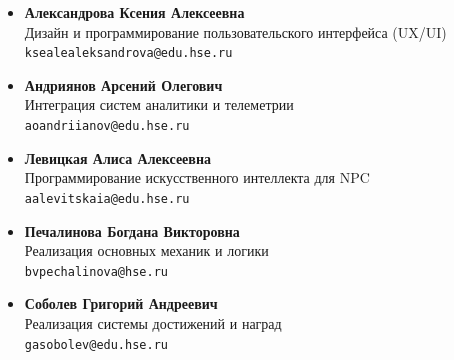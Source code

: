 \documentclass{article}
\begin{document}
	\begin{itemize}
		\item \textbf{Александрова Ксения Алексеевна} \\
		Дизайн и программирование пользовательского интерфейса (UX/UI) \\
		\texttt{ksealealeksandrova@edu.hse.ru}
		
		\item \textbf{Андриянов Арсений Олегович} \\
		Интеграция систем аналитики и телеметрии \\
		\texttt{aoandriianov@edu.hse.ru}
		
		\item \textbf{Левицкая Алиса Алексеевна} \\
		Программирование искусственного интеллекта для NPC \\
		\texttt{aalevitskaia@edu.hse.ru}
		
		\item \textbf{Печалинова Богдана Викторовна} \\
		Реализация основных механик и логики \\
		\texttt{bvpechalinova@hse.ru}
		
		\item \textbf{Соболев Григорий Андреевич} \\
		Реализация системы достижений и наград \\
		\texttt{gasobolev@edu.hse.ru}
	\end{itemize}

	\newpage
	
\end{document}
